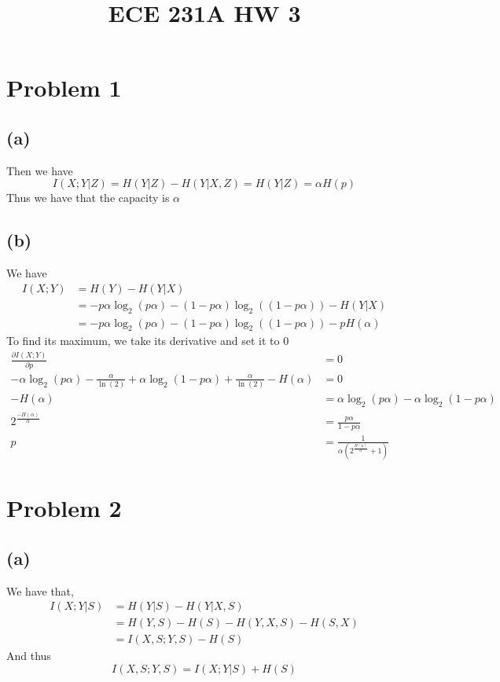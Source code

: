
\title{ECE 231A HW 3}

\maketitle
\section*{Problem 1}
\subsection*{(a)}
Then we have
$$I(X;Y|Z)=H(Y|Z)-H(Y|X,Z)=H(Y|Z)=\alpha H(p)$$
Thus we have that the capacity is $\alpha$
\subsection*{(b)}
We have 
\begin{align*}
    I(X;Y)&=H(Y)-H(Y|X)\\
    &=-p\alpha \log_2(p\alpha)-(1-p\alpha) \log_2((1-p\alpha))-H(Y|X)\\
    &=-p\alpha \log_2(p\alpha)-(1-p\alpha) \log_2((1-p\alpha))-pH(\alpha)
\end{align*}
To find its maximum, we take its derivative and set it to 0
\begin{align*}
    \frac{\partial I(X;Y)}{\partial p}&=0\\
    -\alpha \log_2(p\alpha)-\frac{\alpha}{\ln(2)}+\alpha \log_2(1-p\alpha)+\frac{\alpha}{\ln(2)}-H(\alpha)&=0\\
    -H(\alpha)&= \alpha\log_2(p\alpha)-\alpha \log_2(1-p\alpha)\\
    2^{\frac{-H(\alpha)}{\alpha}}&=\frac{p\alpha}{1-p\alpha}\\
    p&=\boxed{\frac{1}{\alpha(2^{\frac{H(\alpha)}{\alpha}}+1)}}
\end{align*}
\section*{Problem 2}
\subsection*{(a)}
We have that,
\begin{align*}
    I(X;Y|S)&=H(Y|S)-H(Y|X,S)\\
    &=H(Y,S)-H(S)-H(Y,X,S)-H(S,X)\\
    &=I(X,S;Y,S)-H(S)
\end{align*}
And thus 
$$I(X,S;Y,S)=I(X;Y|S)+H(S)$$
